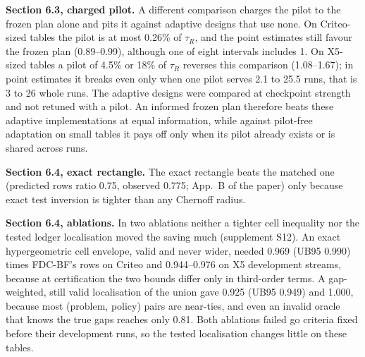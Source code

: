 \documentclass[sigconf,anonymous,review]{acmart}
\begin{document}
\textbf{Section 6.3, charged pilot.} A different comparison charges the pilot to the frozen plan alone and pits it against adaptive designs that use none. On Criteo-sized tables the pilot is at most 0.26\% of $\tau_R$, and the point estimates still favour the frozen plan (0.89--0.99), although one of eight intervals includes 1. On X5-sized tables a pilot of 4.5\% or 18\% of $\tau_R$ reverses this comparison (1.08--1.67); in point estimates it breaks even only when one pilot serves 2.1 to 25.5 runs, that is 3 to 26 whole runs. The adaptive designs were compared at checkpoint strength and not retuned with a pilot. An informed frozen plan therefore beats these adaptive implementations at equal information, while against pilot-free adaptation on small tables it pays off only when its pilot already exists or is shared across runs.

\textbf{Section 6.4, exact rectangle.} The exact rectangle beats the matched one (predicted rows ratio 0.75, observed 0.775; App.~B of the paper) only because exact test inversion is tighter than any Chernoff radius.

\textbf{Section 6.4, ablations.} In two ablations neither a tighter cell inequality nor the tested ledger localisation moved the saving much (supplement S12). An exact hypergeometric cell envelope, valid and never wider, needed 0.969 (UB95 0.990) times FDC-BF's rows on Criteo and 0.944--0.976 on X5 development streams, because at certification the two bounds differ only in third-order terms. A gap-weighted, still valid localisation of the union gave 0.925 (UB95 0.949) and 1.000, because most (problem, policy) pairs are near-ties, and even an invalid oracle that knows the true gaps reaches only 0.81. Both ablations failed go criteria fixed before their development runs, so the tested localisation changes little on these tables.
\end{document}
